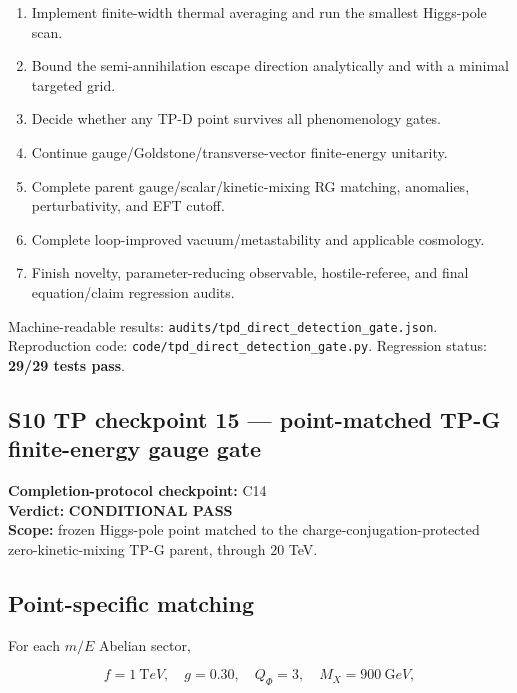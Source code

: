 \documentclass[
]{article}
\providecommand{\tightlist}{%
  \setlength{\itemsep}{0pt}\setlength{\parskip}{0pt}}
\begin{document}
\begin{enumerate}
\def\labelenumi{\arabic{enumi}.}
\tightlist
\item
  Implement finite-width thermal averaging and run the smallest
  Higgs-pole scan.
\item
  Bound the semi-annihilation escape direction analytically and with a
  minimal targeted grid.
\item
  Decide whether any TP-D point survives all phenomenology gates.
\item
  Continue gauge/Goldstone/transverse-vector finite-energy unitarity.
\item
  Complete parent gauge/scalar/kinetic-mixing RG matching, anomalies,
  perturbativity, and EFT cutoff.
\item
  Complete loop-improved vacuum/metastability and applicable cosmology.
\item
  Finish novelty, parameter-reducing observable, hostile-referee, and
  final equation/claim regression audits.
\end{enumerate}

Machine-readable results:
\texttt{audits/tpd\_direct\_detection\_gate.json}. Reproduction code:
\texttt{code/tpd\_direct\_detection\_gate.py}. Regression status:
\textbf{29/29 tests pass}.

\newpage

\hypertarget{s10-tp-checkpoint-15-point-matched-tp-g-finite-energy-gauge-gate}{%
\subsection{S10 TP checkpoint 15 --- point-matched TP-G finite-energy
gauge
gate}\label{s10-tp-checkpoint-15-point-matched-tp-g-finite-energy-gauge-gate}}

\textbf{Completion-protocol checkpoint:} C14\\
\textbf{Verdict:} \textbf{CONDITIONAL PASS}\\
\textbf{Scope:} frozen Higgs-pole point matched to the
charge-conjugation-protected zero-kinetic-mixing TP-G parent, through
\(20\) TeV.

\hypertarget{point-specific-matching}{%
\subsection{Point-specific matching}\label{point-specific-matching}}

For each \(m/E\) Abelian sector,

\[
f=1\ {\mathrm TeV},\quad g=0.30,\quad Q_\Phi=3,\quad M_X=900\ {\mathrm GeV},
\]
\end{document}
